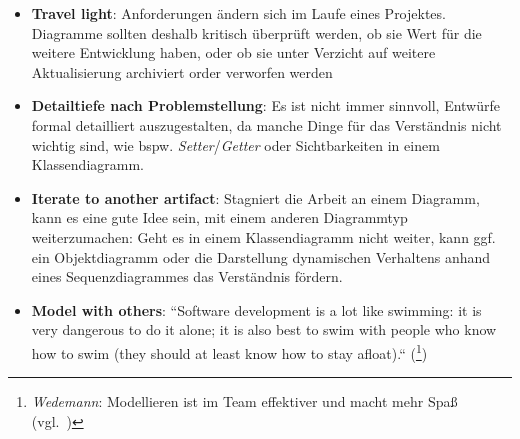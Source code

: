\begin{itemize}
    \item \textbf{Travel light}: Anforderungen ändern sich im Laufe eines Projektes.
    Diagramme sollten deshalb kritisch überprüft werden, ob sie Wert für die weitere Entwicklung haben, oder ob sie unter Verzicht auf weitere Aktualisierung archiviert order verworfen werden
    \item \textbf{Detailtiefe nach Problemstellung}: Es ist nicht immer sinnvoll, Entwürfe formal detailliert auszugestalten, da manche Dinge für das Verständnis nicht wichtig sind, wie bspw. \textit{Setter}/\textit{Getter} oder Sichtbarkeiten in einem Klassendiagramm.
    \item \textbf{Iterate to another artifact}: Stagniert die Arbeit an einem Diagramm, kann es eine gute Idee sein, mit einem anderen Diagrammtyp weiterzumachen: Geht es in einem Klassendiagramm nicht weiter, kann ggf. ein Objektdiagramm oder die Darstellung dynamischen Verhaltens anhand eines Sequenzdiagrammes das Verständnis fördern.
    \item \textbf{Model with others}: ``Software development is a lot like swimming: it is very dangerous to do it alone; it is also best to swim with people who know how to swim (they should at least know how to stay afloat).`` (\cite[52]{Amb04}\footnote{
    \textit{Wedemann}: Modellieren ist im Team effektiver und macht mehr Spaß (vgl.~\cite[52]{Wed09b})
    })
\end{itemize}
